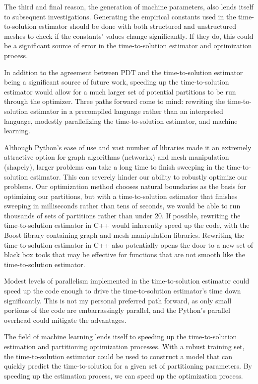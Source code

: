 The third and final reason, the generation of machine parameters, also lends itself to subsequent investigations.
Generating the empirical constants used in the time-to-solution estimator should be done with both structured and unstructured meshes to check if the constants' values change significantly.
If they do, this could be a significant source of error in the time-to-solution estimator and optimization process.

In addition to the agreement between PDT and the time-to-solution estimator being a significant source of future work, speeding up the time-to-solution estimator would allow for a much larger set of potential partitions to be run through the optimizer.
Three paths forward come to mind: rewriting the time-to-solution estimator in a precompiled language rather than an interpreted language, modestly parallelizing the time-to-solution estimator, and machine learning.

Although Python's ease of use and vast number of libraries made it an extremely attractive option for graph algorithms (networkx) and mesh manipulation (shapely), larger problems can take a long time to finish sweeping in the time-to-solution estimator.
This can severely hinder our ability to robustly optimize our problems.
Our optimization method chooses natural boundaries as the basis for optimizing our partitions, but with a time-to-solution estimator that finishes sweeping in milliseconds rather than tens of seconds, we would be able to run thousands of sets of partitions rather than under 20.
If possible, rewriting the time-to-solution estimator in C++ would inherently speed up the code, with the Boost library containing graph and mesh manipulation libraries.
Rewriting the time-to-solution estimator in C++ also potentially opens the door to a new set of black box tools that may be effective for functions that are not smooth like the time-to-solution estimator.

Modest levels of parallelism implemented in the time-to-solution estimator could speed up the code enough to drive the time-to-solution estimator's time down significantly.
This is not my personal preferred path forward, as only small portions of the code are embarrassingly parallel, and the Python's parallel overhead could mitigate the advantages.

The field of machine learning lends itself to speeding up the time-to-solution estimation and partitioning optimization processes.
With a robust training set, the time-to-solution estimator could be used to construct a model that can quickly predict the time-to-solution for a given set of partitioning parameters.
By speeding up the estimation process, we can speed up the optimization process. 

